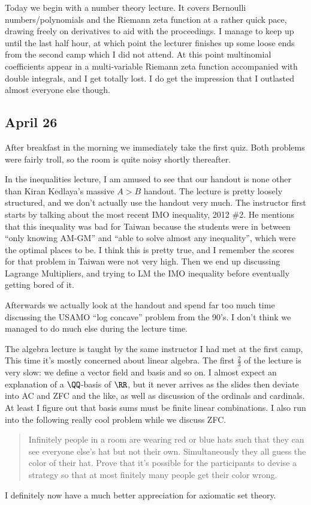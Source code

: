 \documentclass[11pt]{scrreprt}
\begin{document}
Today we begin with a number theory lecture. It covers Bernoulli numbers/polynomials and the Riemann zeta function at a rather quick pace, drawing freely on derivatives to aid with the proceedings. I manage to keep up until the last half hour, at which point the lecturer finishes up some loose ends from the second camp which I did not attend. At this point multinomial coefficients appear in a multi-variable Riemann zeta function accompanied with double integrals, and I get totally lost. I do get the impression that I outlasted almost everyone else though.

\subsection{April 26}
After breakfast in the morning we immediately take the first quiz. Both problems were fairly troll, so the room is quite noisy shortly thereafter.

In the inequalities lecture, I am amused to see that our handout is none other than Kiran Kedlaya's massive $A>B$ handout.
The lecture is pretty loosely structured, and we don't actually use the handout very much. The instructor first starts by talking about the most recent IMO inequality, 2012 \#2. He mentions that this inequality was bad for Taiwan because the students were in between ``only knowing AM-GM'' and ``able to solve almost any inequality'', which were the optimal places to be. I think this is pretty true, and I remember the scores for that problem in Taiwan were not very high.
Then we end up discussing Lagrange Multipliers, and trying to LM the IMO inequality before eventually getting bored of it.

Afterwards we actually look at the handout and spend far too much time discussing the USAMO ``log concave'' problem from the 90's. I don't think we managed to do much else during the lecture time.

The algebra lecture is taught by the same instructor I had met at the first camp, This time it's mostly concerned about linear algebra. The first $\frac 23$ of the lecture is very slow: we define a vector field and basis and so on. I almost expect an explanation of a $\QQ$-basis of $\RR$, but it never arrives as the slides then deviate into AC and ZFC and the like, as well as discussion of the ordinals and cardinals. At least I figure out that basis sums must be finite linear combinations. I also run into the following really cool problem while we discuss ZFC.
\begin{quote}
  Infinitely people in a room are wearing red or blue hats such that they can see everyone else's hat but not their own.
  Simultaneously they all guess the color of their hat.
  Prove that it's possible for the participants to devise a strategy so that at most finitely many people get their color wrong.
\end{quote}
I definitely now have a much better appreciation for axiomatic set theory.
\end{document}
